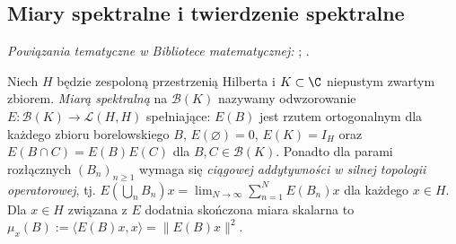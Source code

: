 \subsection{Miary spektralne i twierdzenie spektralne}

\noindent\emph{Powiązania tematyczne w Bibliotece matematycznej:} ; .


\begin{definicja}
\label{def:pvm32}
Niech $H$ będzie zespoloną przestrzenią Hilberta i $K\subset\C$
niepustym zwartym zbiorem. \emph{Miarą spektralną} na
$\mathcal B(K)$ nazywamy odwzorowanie
$E:\mathcal B(K)\to\mathcal L(H,H)$ spełniające:
$E(B)$ jest rzutem ortogonalnym dla każdego zbioru borelowskiego $B$,
$E(\varnothing)=0$, $E(K)=I_H$ oraz
$E(B\cap C)=E(B)E(C)$ dla $B,C\in\mathcal B(K)$.
Ponadto dla parami rozłącznych $(B_n)_{n\geq1}$ wymaga się
\emph{ciągowej addytywności w silnej topologii operatorowej}, tj.
$E(\bigcup_nB_n)x=\lim_{N\to\infty}\sum_{n=1}^NE(B_n)x$
dla każdego $x\in H$.
Dla $x\in H$ związana z $E$ dodatnia skończona miara skalarna
to $\mu_x(B):=\langle E(B)x,x\rangle=\|E(B)x\|^2$.
\end{definicja}

